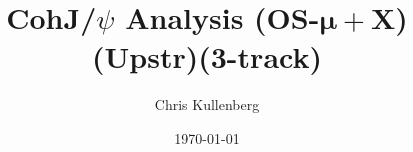 \title{CohJ/$\psi$ Analysis (\textbf{OS}-$\boldsymbol{\mu+}$\textbf{X})(\textbf{Upstr})(\textbf{3-track})}
\author{Chris Kullenberg}
\date{\today}
